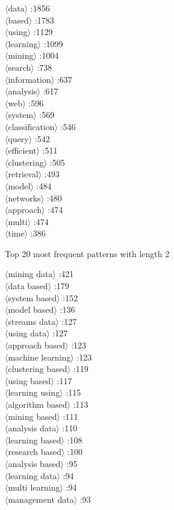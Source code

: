 \documentclass[11pt,a4paper,fleqn]{article}
\begin{document}
\begin{multicols}{4} \noindent 
$\langle$data$\rangle$ :1856\\
$\langle$based$\rangle$ :1783\\
$\langle$using$\rangle$ :1129\\
$\langle$learning$\rangle$ :1099\\
$\langle$mining$\rangle$ :1004\\
$\langle$search$\rangle$ :738\\
$\langle$information$\rangle$ :637\\
$\langle$analysis$\rangle$ :617\\
$\langle$web$\rangle$ :596\\
$\langle$system$\rangle$ :569\\
$\langle$classification$\rangle$ :546\\
$\langle$query$\rangle$ :542\\
$\langle$efficient$\rangle$ :511\\
$\langle$clustering$\rangle$ :505\\
$\langle$retrieval$\rangle$ :493\\
$\langle$model$\rangle$ :484\\
$\langle$networks$\rangle$ :480\\
$\langle$approach$\rangle$ :474\\
$\langle$multi$\rangle$ :474\\
$\langle$time$\rangle$ :386\\
\end{multicols} \noindent
Top 20 most frequent patterns with length 2
\begin{multicols}{3} \noindent
$\langle$mining data$\rangle$ :421\\
$\langle$data based$\rangle$ :179\\
$\langle$system based$\rangle$ :152\\
$\langle$model based$\rangle$ :136\\
$\langle$streams data$\rangle$ :127\\
$\langle$using data$\rangle$ :127\\
$\langle$approach based$\rangle$ :123\\
$\langle$machine learning$\rangle$ :123\\
$\langle$clustering based$\rangle$ :119\\
$\langle$using based$\rangle$ :117\\
$\langle$learning using$\rangle$ :115\\
$\langle$algorithm based$\rangle$ :113\\
$\langle$mining based$\rangle$ :111\\
$\langle$analysis data$\rangle$ :110\\
$\langle$learning based$\rangle$ :108\\
$\langle$research based$\rangle$ :100\\
$\langle$analysis based$\rangle$ :95\\
$\langle$learning data$\rangle$ :94\\
$\langle$multi learning$\rangle$ :94\\
$\langle$management data$\rangle$ :93\\
\end{multicols} \noindent
\end{document}
